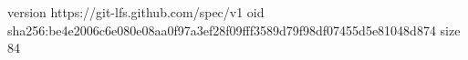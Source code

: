 version https://git-lfs.github.com/spec/v1
oid sha256:be4e2006c6e080e08aa0f97a3ef28f09fff3589d79f98df07455d5e81048d874
size 84
